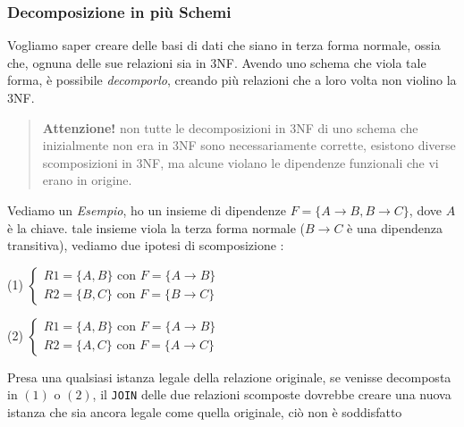 \documentclass[12pt, letterpaper]{article}
\newcommand{\code}[1]{\colorbox{light-gray}{\texttt{#1}}}
\begin{document}
\subsubsection{Decomposizione in più Schemi}\label{Decomposizione}
Vogliamo saper creare delle basi di dati che siano in terza forma normale, ossia che, ognuna delle sue relazioni sia 
in 3NF. Avendo uno schema che viola tale forma, è possibile \textit{decomporlo}, creando più relazioni che a loro 
volta non violino la 3NF.\begin{quote}
    \textbf{Attenzione!} non tutte le decomposizioni in 3NF di uno schema che inizialmente non era in 3NF sono necessariamente
    corrette, esistono diverse scomposizioni in 3NF, ma alcune violano le dipendenze funzionali che vi erano in origine.
\end{quote}
Vediamo un \textit{Esempio}, ho un insieme di dipendenze \(F=\{A\rightarrow B,B\rightarrow C\}\), dove \(A\) è la chiave. 
tale insieme viola la terza forma normale (\(B\rightarrow C\) è una dipendenza transitiva), vediamo due ipotesi di scomposizione :
\begin{center}
    (1) \(
        \begin{cases}
            R1 = \{A,B\} \text{ con } F=\{A\rightarrow B\}\\
            R2 = \{B,C\} \text{ con } F=\{B\rightarrow C\}
        \end{cases}
    \)
\end{center}
\begin{center}
    (2) \(
        \begin{cases}
            R1 = \{A,B\} \text{ con } F=\{A\rightarrow B\}\\
            R2 = \{A,C\} \text{ con } F=\{A\rightarrow C\}
        \end{cases}
    \)
\end{center}
Presa una qualsiasi istanza legale della relazione originale, se venisse decomposta in \((1)\) o \((2)\), il \code{JOIN} delle 
due relazioni scomposte dovrebbe creare una nuova istanza che sia ancora legale come quella originale, ciò non è soddisfatto 
\end{document}
